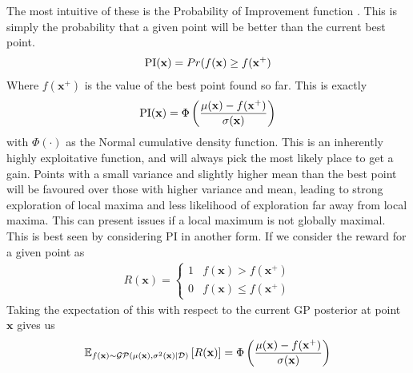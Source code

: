 The most intuitive of these is the Probability of Improvement function \citep{kushner1964new}. This is simply the probability that a given point will be better than the current best point.
\begin{align}
	\operatorname{PI}(\mathbf{x}) = Pr(f(\mathbf{x}) \geq f(\mathbf{x}^+)
\end{align}
Where \( f(\mathbf{x}^+) \) is the value of the best point found so far. This is exactly
\begin{align}
	\operatorname{PI}(\mathbf{x}) = \Phi\left(\frac{\mu(\mathbf{x}) - f(\mathbf{x}^+)}{\sigma(\mathbf{x})}\right)
\end{align}
with \( \Phi(\cdot) \) as the Normal cumulative density function. This is an inherently highly exploitative function, and will always pick the most likely place to get a gain. Points with a small variance and slightly higher mean than the best point will be favoured over those with higher variance and mean, leading to strong exploration of local maxima and less likelihood of exploration far away from local maxima. This can present issues if a local maximum is not globally maximal. This is best seen by considering PI in another form. If we consider the reward for a given point as
\begin{align}
	R(\mathbf{x}) = \begin{cases}
	 1 & f(\mathbf{x}) > f(\mathbf{x}^+)\\
	 0 & f(\mathbf{x}) \leq f(\mathbf{x}^+)
	\end{cases}
\end{align}
Taking the expectation of this with respect to the current GP posterior at point \( \mathbf{x} \) gives us
\begin{align}
	\mathbb{E}_{f(\mathbf{x}) \sim \operatorname{\mathcal{GP}}(\mu(\mathbf{x}), \sigma^2(\mathbf{x})| \mathcal{D})}\left[  R(\mathbf{x}) \right] = \Phi\left(\frac{\mu(\mathbf{x}) - f(\mathbf{x}^+)}{\sigma(\mathbf{x})}\right)
\end{align}

